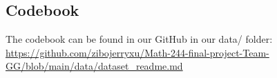\documentclass[
  letterpaper,
  DIV=11,
  numbers=noendperiod]{scrartcl}
\begin{document}
\subsection{Codebook}\label{codebook}

The codebook can be found in our GitHub in our data/ folder:
\url{https://github.com/zibojerryxu/Math-244-final-project-Team-GG/blob/main/data/dataset_readme.md}
\end{document}
